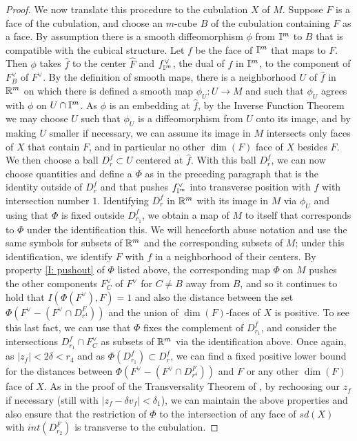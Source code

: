 \begin{proof}
	We now translate this procedure to the cubulation $X$ of $M$.
	Suppose $F$ is a face of the cubulation, and choose an $m$-cube $B$ of the cubulation containing $F$ as a face.
	By assumption there is a smooth diffeomorphism $\phi$ from $\mathbb{I}^m$ to $B$ that is compatible with the cubical structure.
	Let $f$ be the face of $\mathbb{I}^m$ that maps to $F$.
	Then $\phi$ takes $\hat f$ to the center $\hat F$ and $f^\vee_{\mathbb{I}^m}$, the dual of $f$ in $\mathbb{I}^m$, to the component of $F_B^\vee$ of $F^\vee$.
	By the definition of smooth maps, there is a neighborhood $U$ of $\hat f$ in $\mathbb{R}^m$ on which there is defined a smooth map $\phi_U \colon U \to M$ and such that $\phi_U$ agrees with $\phi$ on $U \cap \mathbb{I}^m$.
	As $\phi$ is an embedding at $\hat f$, by the Inverse Function Theorem we may choose $U$ such that $\phi_U$ is a diffeomorphism from $U$ onto its image, and by making $U$ smaller if necessary, we can assume its image in $M$ intersects only faces of $X$ that contain $F$, and in particular no other $\dim(F)$ face of $X$ besides $F$.
	We then choose a ball $D_r^f \subset U$ centered at $\hat f$.
	With this ball $D_r^f$, we can now choose quantities and define a $\Phi$ as in the preceding paragraph that is the identity outside of $D_r^f$ and that pushes $f^\vee_{\mathbb{I}^m}$ into transverse position with $f$ with intersection number $1$.
	Identifying $D_r^f$ in $\mathbb{R}^m$ with its image in $M$ via $\phi_U$ and using that $\Phi$ is fixed outside $D_{r_1}^f$, we obtain a map of $M$ to itself that corresponds to $\Phi$ under the identification this.
	We will henceforth abuse notation and use the same symbols for subsets of $\mathbb{R}^m$ and the corresponding subsets of $M$; under this identification, we identify $F$ with $f$ in a neighborhood of their centers.
	By property \eqref{I: pushout} of $\Phi$ listed above, the corresponding map $\Phi$ on $M$ pushes the other components $F^\vee_C$ of $F^\vee$ for $C\neq B$ away from $B$, and so it continues to hold that $I(\Phi(F^\vee),F) = 1$ and also the distance between the set $\Phi(F^\vee-(F^\vee \cap D_{r^4}^F))$ and the union of $\dim(F)$-faces of $X$ is positive.
	To see this last fact, we can use that $\Phi$ fixes the complement of $D_{r_1}^f$, and consider the intersections $D_{r_1}^f \cap F^\vee_C$ as subsets of $\mathbb{R}^m$ via the identification above.
	Once again, as $|z_f| < 2 \delta < r_4$ and as $\Phi(D_{r_1}^f)\subset D_r^f$, we can find a fixed positive lower bound for the distances between $\Phi(F^\vee-(F^\vee \cap D_{r^4}^F))$ and $F$ or any other $\dim(F)$ face of $X$.
	As in the proof of the Transversality Theorem of \cite{GuPo74}, by rechoosing our $z_f$ if necessary (still with $|z_f - \delta v_f| < \delta_1$), we can maintain the above properties and also ensure that the restriction of $\Phi$ to the intersection of any face of $sd(X)$ with $int(D_{r_2}^F)$ is transverse to the cubulation\footnotemark.


\end{proof}
